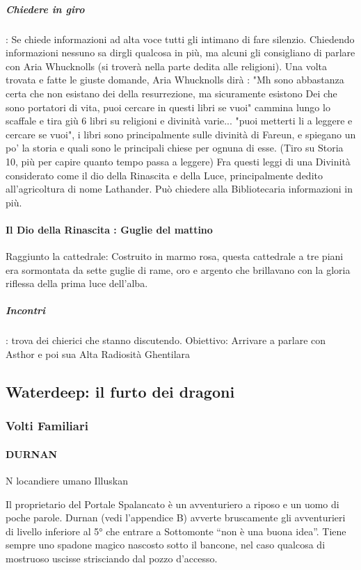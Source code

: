 \documentclass{article}
\begin{document}
                  \subparagraph{Chiedere in giro}: Se chiede informazioni ad alta voce tutti gli intimano di fare silenzio. Chiedendo informazioni nessuno sa dirgli qualcosa in più, ma alcuni gli consigliano di parlare con Aria Whucknolls (si troverà nella parte dedita alle religioni). Una volta trovata e fatte le giuste domande, Aria Whucknolls dirà : "Mh sono abbastanza certa che non esistano dei della resurrezione, ma sicuramente esistono Dei che sono portatori di vita, puoi cercare in questi libri se vuoi" cammina lungo lo scaffale e tira giù 6 libri su religioni e divinità varie... "puoi metterti li a leggere  e cercare se vuoi", i libri sono principalmente sulle divinità di Fareun, e spiegano un po' la storia e quali sono le principali chiese per ognuna di esse.
                  (Tiro su Storia 10, più per capire quanto tempo passa a leggere) Fra questi leggi di una Divinità considerato come il dio della Rinascita e della Luce, principalmente dedito all'agricoltura di nome Lathander. Può chiedere alla Bibliotecaria informazioni in più. 
            
                 \paragraph{Il Dio della Rinascita : Guglie del mattino}
                 Raggiunto la cattedrale:  Costruito in marmo rosa, questa cattedrale a tre piani era sormontata da sette
                 guglie di rame, oro e argento che brillavano con la gloria riflessa della prima luce dell’alba. 

                 \subparagraph{Incontri}: trova dei chierici che stanno discutendo. Obiettivo: Arrivare a parlare con Asthor e poi sua Alta Radiosità Ghentilara
        \subsection{Waterdeep: il furto dei dragoni}

            \subsubsection{Volti Familiari}

                \paragraph{DURNAN}
N locandiere umano Illuskan

Il proprietario del Portale Spalancato è un avventuriero a riposo e un uomo di poche parole. Durnan (vedi l'appendice B) avverte bruscamente gli avventurieri di livello inferiore al 5° che entrare a Sottomonte “non è una buona idea”. Tiene sempre uno spadone magico nascosto sotto il bancone, nel caso qualcosa di mostruoso uscisse strisciando dal pozzo d'accesso.
\end{document}
